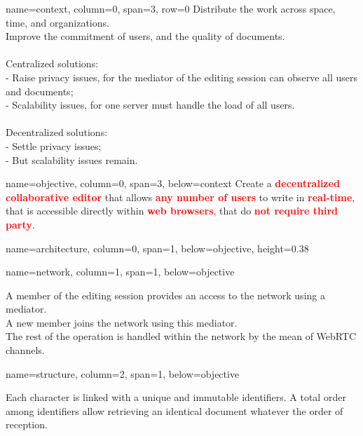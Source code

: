 \documentclass[a1paper, fontscale=0.38, portrait]{baposter}
\newcommand{\BOLD}[1]{\textcolor{red}{\textbf{#1}}}
\begin{document}
\begin{poster}
  {name=context, column=0, span=3, row=0} {
    Distribute the work across space, time, and organizations.\\
    Improve the commitment of users, and the quality of documents.\\
    \\
    Centralized solutions: \\
    - Raise privacy issues, for the mediator of the editing session can
      observe all users and documents; \\
    - Scalability issues, for one server must handle the load of all users. \\
    \\
    Decentralized solutions: \\
    - Settle privacy issues; \\
    - But scalability issues remain.
  }

  
  {name=objective, column=0, span=3, below=context} {
    Create a \BOLD{decentralized collaborative editor} that allows \BOLD{any number
      of users} to write in \BOLD{real-time}, that is accessible directly within
    \BOLD{web browsers}, that do \BOLD{not require third party}.
  }

  {name=architecture, column=0, span=1, below=objective, height=0.38}{
    \begin{center}
      
    \end{center}
  }
  
  {name=network, column=1, span=1, below=objective}{
    \begin{center}
            
    \end{center}
    \footnotesize
    A member of the editing session provides an access to the network using
    a mediator. \\
    A new member joins the network using this mediator. \\
    The rest of the operation is handled within the network by the mean of
    WebRTC channels.
  }

  {name=structure, column=2, span=1, below=objective}{
    \begin{center}
      
    \end{center}
    \footnotesize
    Each character is linked with a unique and immutable identifiers. A total
    order among identifiers allow retrieving an identical document whatever the
    order of reception.}


\end{poster}
\end{document}
